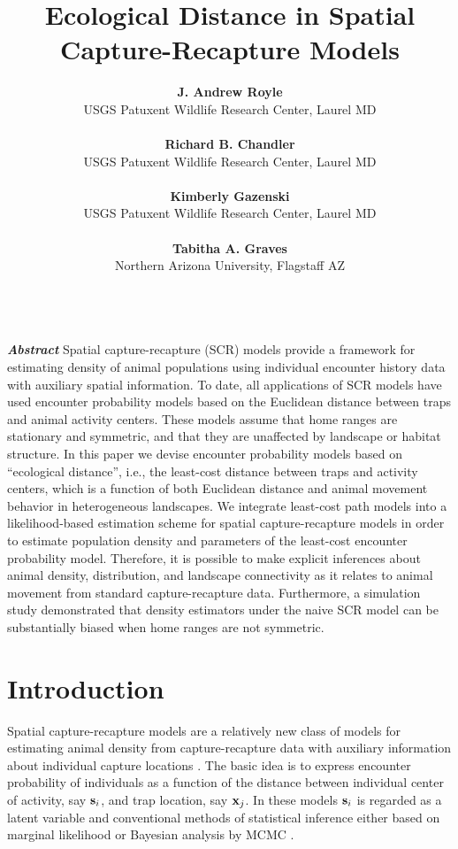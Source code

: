 \documentclass[12pt]{article}
\title{Ecological Distance in Spatial Capture-Recapture Models}
\author{
{\bf J. Andrew Royle}\\
USGS Patuxent Wildlife Research Center, Laurel MD \\ \\
{\bf Richard B. Chandler} \\
USGS Patuxent Wildlife Research Center, Laurel MD\\ \\
{\bf Kimberly Gazenski} \\
USGS Patuxent Wildlife Research Center, Laurel MD\\ \\
{\bf Tabitha A. Graves} \\
Northern Arizona University, Flagstaff AZ \\ \\
}
\begin{document}

\maketitle

\date

\newpage

\linenumbers

\begin{flushleft}
{\em \bf Abstract}
Spatial capture-recapture (SCR) models provide a framework for estimating density of 
animal populations using individual encounter history data with auxiliary spatial information. 
To date, all applications of SCR models have used encounter probability models based on 
the Euclidean distance between traps and animal activity centers. These models assume 
that home ranges are stationary and symmetric, and that they are unaffected by landscape 
or habitat structure. In this paper we devise encounter probability models based on 
``ecological distance'', i.e., the least-cost distance between traps and activity centers, 
which is a function of both Euclidean distance and animal movement behavior in heterogeneous 
landscapes. We integrate least-cost path models into a likelihood-based estimation
scheme for spatial capture-recapture models in order to estimate population density and 
parameters of the least-cost encounter probability model.  
Therefore, it is possible to make explicit inferences about animal density, distribution, 
and landscape connectivity as it relates to animal movement from standard capture-recapture data.
Furthermore, a simulation study demonstrated that density estimators under the naive SCR 
model can be substantially biased when home ranges are not symmetric. 
\end{flushleft}

\section{Introduction}


Spatial capture-recapture models are a relatively new class of models
for estimating animal density from capture-recapture data with
auxiliary information about individual capture locations
\citep{borchers_efford:2008, royle_young:2008, efford_etal:2009,
  royle_etal:2009ecol}.
The basic idea is to express encounter probability of
individuals as a function of the distance between individual center of
activity, say ${\bf s}_{i}$, and trap location, say ${\bf x}_{j}$.  In
these models ${\bf s}_{i}$ is regarded as a latent variable and
conventional methods of statistical inference either based on marginal
likelihood \citep{borchers_efford:2008} or Bayesian analysis by MCMC
\citep{royle_young:2008}.
\end{document}
